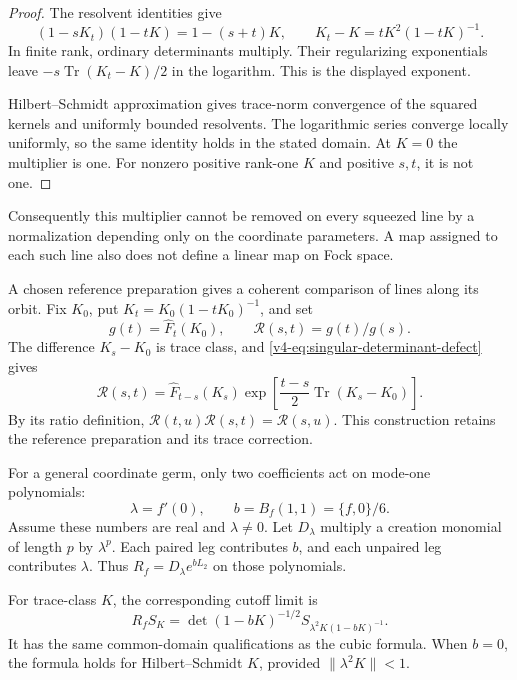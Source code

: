 \begin{proof}
The resolvent identities give
\[
 (1-sK_t)(1-tK)=1-(s+t)K,\qquad
 K_t-K=tK^2(1-tK)^{-1}.
\]
In finite rank, ordinary determinants multiply.
Their regularizing exponentials leave
\(-s\operatorname{Tr}(K_t-K)/2\) in the logarithm.
This is the displayed exponent.

Hilbert--Schmidt approximation gives trace-norm
convergence of the squared kernels and
uniformly bounded resolvents.
The logarithmic series converge locally uniformly,
so the same identity holds in the stated domain.
At \(K=0\) the multiplier is one.
For nonzero positive rank-one \(K\) and
positive \(s,t\), it is not one.
\end{proof}

Consequently this multiplier cannot be removed
on every squeezed line by a normalization
depending only on the coordinate parameters.
A map assigned to each such line also
does not define a linear map on Fock space.

A chosen reference preparation gives a
coherent comparison of lines along its orbit.
Fix \(K_0\), put \(K_t=K_0(1-tK_0)^{-1}\), and set
\[
 g(t)=\widehat F_t(K_0),\qquad
 \mathcal R(s,t)=g(t)/g(s).
\]
The difference \(K_s-K_0\) is trace class, and
\eqref{v4-eq:singular-determinant-defect} gives
\begin{equation}\label{v4-eq:singular-anchored-transport}
 \mathcal R(s,t)
   =\widehat F_{t-s}(K_s)
        \exp\left[\frac{t-s}{2}\operatorname{Tr}(K_s-K_0)\right].
\end{equation}
By its ratio definition,
\(\mathcal R(t,u)\mathcal R(s,t)=\mathcal R(s,u)\).
This construction retains the reference
preparation and its trace correction.

For a general coordinate germ, only two
coefficients act on mode-one polynomials:
\[
                   \lambda=f'(0),\qquad b=B_f(1,1)=\{f,0\}/6.
\]
Assume these numbers are real and \(\lambda\ne0\).
Let \(D_\lambda\) multiply a creation monomial
of length \(p\) by \(\lambda^p\).
Each paired leg contributes \(b\), and
each unpaired leg contributes \(\lambda\).
Thus \(R_f=D_\lambda e^{bL_2}\) on those polynomials.

For trace-class \(K\), the corresponding cutoff limit is
\begin{equation}\label{v4-eq:singular-first-mode-transport}
 R_fS_K=\det(1-bK)^{-1/2}
                   S_{\lambda^2K(1-bK)^{-1}}.
\end{equation}
It has the same common-domain qualifications
as the cubic formula.
When \(b=0\), the formula holds for
Hilbert--Schmidt \(K\), provided
\(\|\lambda^2K\|<1\).

